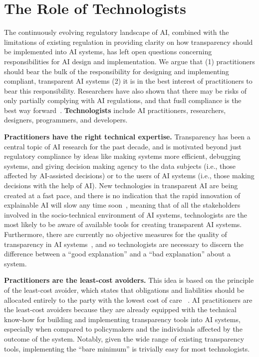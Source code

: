 \section{The Role of Technologists}

The continuously evolving regulatory landscape of AI, combined with the limitations of existing regulation in providing clarity on how transparency should be implemented into AI systems, has left open questions concerning responsibilities for AI design and implementation. We argue that (1) practitioners should bear the bulk of the responsibility for designing and implementing compliant, transparent AI systems (2) it is in the best interest of practitioners to bear this responsibility. Researchers have also shown that there may be risks of only partially complying with AI regulations, and that fusll compliance is the best way forward~\cite{dai2021fair}. {\bf Technologists} include AI practitioners, researchers, designers, programmers, and developers.

{\bf Practitioners have the right technical expertise.} Transparency has been a central topic of AI research for the past decade, and is motivated beyond just regulatory compliance by ideas like making systems more efficient, debugging systems, and giving decision making agency to the data subjects (i.e., those affected by AI-assisted decisions) or to the users of AI systems (i.e., those making decisions with the help of AI). New technologies in transparent AI are being created at a fast pace, and there is no indication that the rapid innovation of explainable AI will slow any time soon~\cite{DBLP:conf/nips/LundbergL17, ribeiro2016should, datta2016algorithmic, DBLP:journals/corr/abs-2004-00668, DBLP:journals/corr/abs-2004-00668}, meaning that of all the stakeholders involved in the socio-technical environment of AI systems, technologists are the most likely to be aware of available tools for creating transparent AI systems. Furthermore, there are currently no objective measures for the quality of transparency in AI systems~\cite{gunning2019xai, abdul2020cogam, yang2019study, holzinger2020measuring, lu2019good}, and so technologists are necessary to discern the difference between a ``good explanation'' and a ``bad explanation'' about a system.

{\bf Practitioners are the least-cost avoiders.} This idea is based on the principle of the least-cost avoider, which states that obligations and liabilities should be allocated entirely to the party with the lowest cost of care ~\cite{stoyanovich2016revealing}. AI practitioners are the least-cost avoiders because they are already equipped with the technical know-how for building and implementing transparency tools into AI systems, especially when compared to policymakers and the individuals affected by the outcome of the system. Notably, given the wide range of existing transparency tools, implementing the ``bare minimum'' is trivially easy for most technologists.

